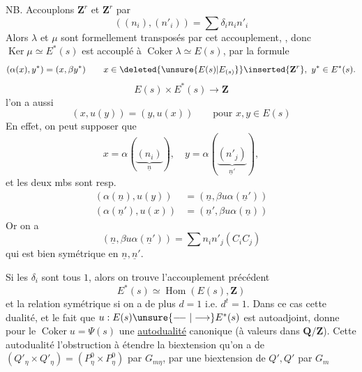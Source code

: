 NB. Accouplons $\mathbf Z^r$ et $\mathbf Z^r$ par
\[
((n_i),(n'_i))=\sum\delta_i n_i n'_i
\]
Alors $\lambda$ et $\mu$ sont formellement transposés par cet accouplement,
, donc $\operatorname{Ker}\mu\simeq E^*(s)$ est accouplé à $\operatorname{Coker}\lambda\simeq E(s)$, par la formule
\[
(\alpha(x),y^*)=(x,\beta y^*)\qquad x\in\deleted{\unsure{E(s)|E_{(s)}}}\inserted{\mathbf Z^r},\ y^*\in E^*(s).
\]
\[
E(s)\times E^*(s)\longrightarrow\mathbf Z
\]
 l'on a aussi
\[
(x,u(y))=(y,u(x))\qquad\text{pour }x,y\in E(s)
\]
En effet, on peut supposer que
\[
x=\alpha(\underbrace{(n_i)}_{\underline n}),\quad y=\alpha(\underbrace{(n'_j)}_{\underline n'}),
\]
et les deux mbs sont resp.
\[
\begin{aligned}
(\alpha(\underline n),u(y))&=(\underline n,\beta u\alpha(\underline n'))\\
(\alpha(\underline n'),u(x))&=(\underline n',\beta u\alpha(\underline n))
\end{aligned}
\]
Or on a
\[
(\underline n,\beta u\alpha(\underline n'))=\sum n_i n'_j(C_i C_j)
\]
qui est bien symétrique en  $\underline n,\underline n'$.

Si les $\delta_i$ sont tous $1$,  alors on trouve  l'accouplement précédent
\[
E^*(s)\simeq\operatorname{Hom}(E(s),\mathbf Z)
\]
et la relation symétrique si on a de plus $d=1$ i.e. $d^t=1$.
Dans ce cas cette dualité, et le fait que $u:E(s)\unsure{\relbar\joinrel\relbar|\longrightarrow}E^*(s)$ \unsure{:} est autoadjoint, donne pour le $\operatorname{Coker}u=\Psi(s)$ une \uline{autodualité} canonique (à valeurs dans $\mathbf Q/\mathbf Z$).
Cette autodualité  l'obstruction à étendre la biextension qu'on a de $(Q'_\eta\times Q'_\eta)=(P^0_\eta\times P^0_\eta)$ par $G_{m\eta}$, par une biextension de $Q',Q'$ par $G_m$

